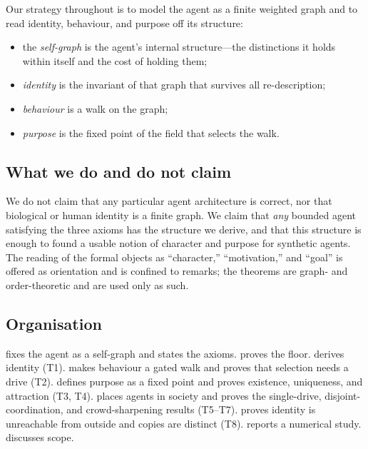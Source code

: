 \documentclass[11pt,twocolumn,a4paper]{article}
\begin{document}
Our strategy throughout is to model the agent as a finite weighted graph
and to read identity, behaviour, and purpose off its structure:

\begin{itemize}[leftmargin=*]
\item the \emph{self-graph} is the agent's internal structure---the
distinctions it holds within itself and the cost of holding them;
\item \emph{identity} is the invariant of that graph that survives all
re-description;
\item \emph{behaviour} is a walk on the graph;
\item \emph{purpose} is the fixed point of the field that selects the
walk.
\end{itemize}

\subsection{What we do and do not claim}

We do not claim that any particular agent architecture is correct, nor
that biological or human identity is a finite graph. We claim that
\emph{any} bounded agent satisfying the three axioms has the structure we
derive, and that this structure is enough to found a usable notion of
character and purpose for synthetic agents. The reading of the formal
objects as ``character,'' ``motivation,'' and ``goal'' is offered as
orientation and is confined to remarks; the theorems are graph- and
order-theoretic and are used only as such.

\subsection{Organisation}

 fixes the agent as a self-graph and states the axioms.
 proves the floor.  derives identity
(T1).  makes behaviour a gated walk and proves that
selection needs a drive (T2).  defines purpose as a
fixed point and proves existence, uniqueness, and attraction (T3, T4).
 places agents in society and proves the single-drive,
disjoint-coordination, and crowd-sharpening results (T5--T7).
 proves identity is unreachable from outside and
copies are distinct (T8).  reports a numerical
study.  discusses scope.
\end{document}
